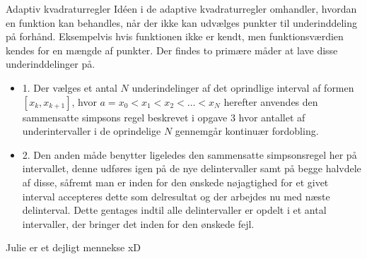 
\begin{frame}{Adaptiv kvadraturregler}
    Idéen i de adaptive kvadraturregler omhandler, hvordan en funktion kan behandles, når der ikke kan udvælges punkter til underinddeling på forhånd. Eksempelvis hvis funktionen ikke er kendt, men funktionsværdien kendes for en mængde af punkter. Der findes to primære måder at lave disse underinddelinger på. 
    \begin{itemize}
        \item 1. Der vælges et antal $N$ underindelinger af det oprindlige interval af formen $\left [  x_k, x_{k+1} \right ]$, hvor $a=x_0<x_1<x_2<\ldots<x_N$ herefter anvendes den sammensatte simpsons regel beskrevet i opgave 3 hvor antallet af underintervaller i de oprindelige $N$ gennemgår kontinuær fordobling.
        \item 2. Den anden måde benytter ligeledes den sammensatte simpsonsregel her på intervallet, denne udføres igen på de nye delintervaller samt på begge halvdele af disse, såfremt man er inden for den ønskede nøjagtighed for et givet interval accepteres dette som delresultat og der arbejdes nu med næste delinterval. Dette gentages indtil alle delintervaller er opdelt i et antal intervaller, der bringer det inden for den ønskede fejl.
    \end{itemize}
\end{frame}
%
%
%
\begin{frame}{Julie er et dejligt mennekse xD}
\phantom{H} \\
\centering
%
%
{\small
{}
}
\end{frame}